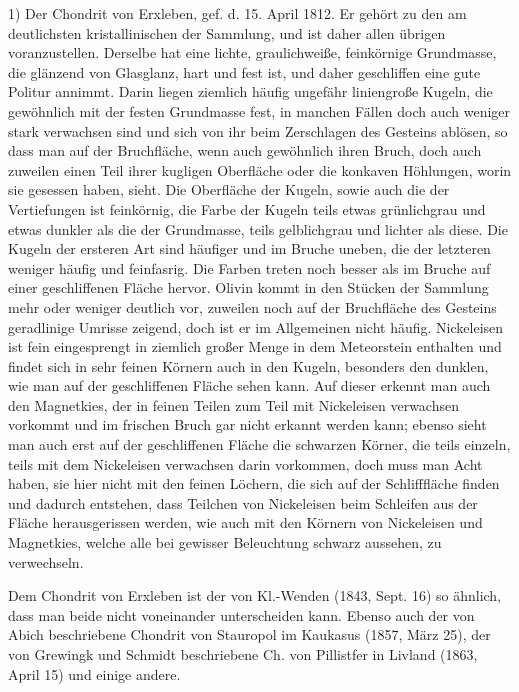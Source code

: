 \documentclass[a4paper, 11pt, oneside]{article}
\begin{document}
1) Der Chondrit von Erxleben, gef. d. 15. April 1812. Er gehört zu den am deutlichsten kristallinischen der Sammlung, und ist daher allen übrigen voranzustellen. Derselbe hat eine lichte, graulichweiße, feinkörnige Grundmasse, die glänzend von Glasglanz, hart und fest ist, und daher geschliffen eine gute Politur annimmt. Darin liegen ziemlich häufig ungefähr liniengroße Kugeln, die gewöhnlich mit der festen Grundmasse fest, in manchen Fällen doch auch weniger stark verwachsen sind und sich von ihr beim Zerschlagen des Gesteins ablösen, so dass man auf der Bruchfläche, wenn auch gewöhnlich ihren Bruch, doch auch zuweilen einen Teil ihrer kugligen Oberfläche oder die konkaven Höhlungen, worin sie gesessen haben, sieht. Die Oberfläche der Kugeln, sowie auch die der Vertiefungen ist feinkörnig, die Farbe der Kugeln teils etwas grünlichgrau und etwas dunkler als die der Grundmasse, teils gelblichgrau und lichter als diese. Die Kugeln der ersteren Art sind häufiger und im Bruche uneben, die der letzteren weniger häufig und feinfasrig. Die Farben treten noch besser als im Bruche auf einer geschliffenen Fläche hervor. Olivin kommt in den Stücken der Sammlung mehr oder weniger deutlich vor, zuweilen noch auf der Bruchfläche des Gesteins geradlinige Umrisse zeigend, doch ist er im Allgemeinen nicht häufig. Nickeleisen ist fein eingesprengt in ziemlich großer Menge in dem Meteorstein enthalten und findet sich in sehr feinen Körnern auch in den Kugeln, besonders den dunklen, wie man auf der geschliffenen Fläche sehen kann. Auf dieser erkennt man auch den Magnetkies, der in feinen Teilen zum Teil mit Nickeleisen verwachsen vorkommt und im frischen Bruch gar nicht erkannt werden kann; ebenso sieht man auch erst auf der geschliffenen Fläche die schwarzen Körner, die teils einzeln, teils mit dem Nickeleisen verwachsen darin vorkommen, doch muss man Acht haben, sie hier nicht mit den feinen Löchern, die sich auf der Schlifffläche finden und dadurch entstehen, dass Teilchen von Nickeleisen beim Schleifen aus der Fläche herausgerissen werden, wie auch mit den Körnern von Nickeleisen und Magnetkies, welche alle bei gewisser Beleuchtung schwarz aussehen, zu verwechseln.

Dem Chondrit von Erxleben ist der von Kl.-Wenden (1843, Sept. 16) so ähnlich, dass man beide nicht voneinander unterscheiden kann. Ebenso auch der von Abich beschriebene Chondrit von Stauropol im Kaukasus (1857, März 25), der von Grewingk und Schmidt beschriebene Ch. von Pillistfer in Livland (1863, April 15) und einige andere.
\end{document}
